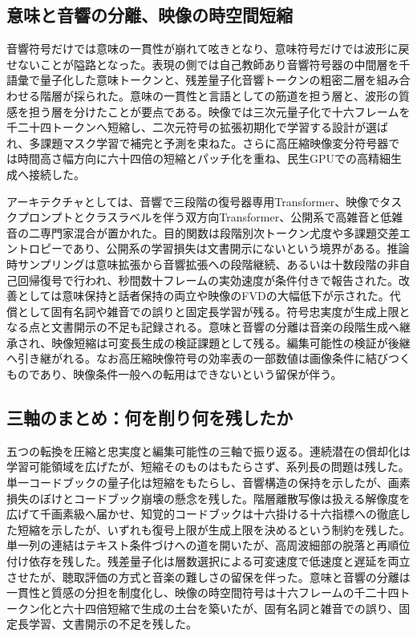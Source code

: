 \documentclass[lualatex,a4paper,10pt]{jlreq}
\begin{document}
\subsection{意味と音響の分離、映像の時空間短縮}
音響符号だけでは意味の一貫性が崩れて呟きとなり、意味符号だけでは波形に戻せないことが隘路となった。表現の側では自己教師あり音響符号器の中間層を千語彙で量子化した意味トークンと、残差量子化音響トークンの粗密二層を組み合わせる階層が採られた\autocite{btd009}。意味の一貫性と言語としての筋道を担う層と、波形の質感を担う層を分けたことが要点である。映像では三次元量子化で十六フレームを千二十四トークンへ短縮し、二次元符号の拡張初期化で学習する設計が選ばれ、多課題マスク学習で補完と予測を束ねた\autocite{btd010}。さらに高圧縮映像変分符号器では時間高さ幅方向に六十四倍の短縮とパッチ化を重ね、民生GPUでの高精細生成へ接続した\autocite{btd012}。

アーキテクチャとしては、音響で三段階の復号器専用Transformer、映像でタスクプロンプトとクラスラベルを伴う双方向Transformer、公開系で高雑音と低雑音の二専門家混合が置かれた\autocite{btd009,btd010}。目的関数は段階別次トークン尤度や多課題交差エントロピーであり、公開系の学習損失は文書開示にないという境界がある\autocite{btd012}。推論時サンプリングは意味拡張から音響拡張への段階継続、あるいは十数段階の非自己回帰復号で行われ、秒間数十フレームの実効速度が条件付きで報告された\autocite{btd009,btd010}。改善としては意味保持と話者保持の両立や映像のFVDの大幅低下が示された\autocite{btd009,btd010}。代償として固有名詞や雑音での誤りと固定長学習が残る。符号忠実度が生成上限となる点と文書開示の不足も記録される。意味と音響の分離は音楽の段階生成へ継承され、映像短縮は可変長生成の検証課題として残る。編集可能性の検証が後継へ引き継がれる。なお高圧縮映像符号の効率表の一部数値は画像条件に結びつくものであり、映像条件一般への転用はできないという留保が伴う\autocite{btd012}。

\subsection{三軸のまとめ：何を削り何を残したか}
五つの転換を圧縮と忠実度と編集可能性の三軸で振り返る。連続潜在の償却化は学習可能領域を広げたが、短縮そのものはもたらさず、系列長の問題は残した\autocite{btd001}。単一コードブックの量子化は短縮をもたらし、音響構造の保持を示したが、画素損失のぼけとコードブック崩壊の懸念を残した\autocite{btd002}。階層離散写像は扱える解像度を広げて千画素級へ届かせ、知覚的コードブックは十六掛ける十六指標への徹底した短縮を示したが、いずれも復号上限が生成上限を決めるという制約を残した\autocite{btd003,btd004}。単一列の連結はテキスト条件づけへの道を開いたが、高周波細部の脱落と再順位付け依存を残した\autocite{btd005}。残差量子化は層数選択による可変速度で低速度と遅延を両立させたが、聴取評価の方式と音楽の難しさの留保を伴った\autocite{btd006,btd007,btd008}。意味と音響の分離は一貫性と質感の分担を制度化し、映像の時空間符号は十六フレームの千二十四トークン化と六十四倍短縮で生成の土台を築いたが、固有名詞と雑音での誤り、固定長学習、文書開示の不足を残した\autocite{btd009,btd010,btd012}。
\end{document}
